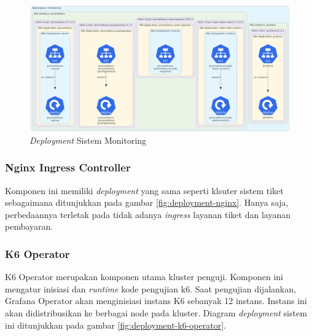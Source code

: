 \begin{figure}[htbp]
    \centering
    \includegraphics[width=1\textwidth]{resources/chapter-4/agent-monitoring.png}
    \caption{\textit{Deployment} Sistem Monitoring}
    \label{fig:deployment-monitoring-agent}
\end{figure}

\subsubsection{Nginx Ingress Controller}

Komponen ini memiliki \textit{deployment} yang sama seperti klsuter sistem tiket sebagaimana ditunjukkan pada gambar \ref{fig:deployment-nginx}. Hanya saja, perbedaannya terletak pada tidak adanya \textit{ingress} layanan tiket dan layanan pembayaran.

\pagebreak

\subsubsection{K6 Operator}

K6 Operator merupakan komponen utama kluster penguji. Komponen ini mengatur inisiasi dan \textit{runtime} kode pengujian k6. Saat pengujian dijalankan, Grafana Operator akan menginisiasi instans K6 sebanyak 12 instans. Instans ini akan didistribusikan ke berbagai node pada kluster. Diagram \textit{deployment} sistem ini ditunjukkan pada gambar \ref{fig:deployment-k6-operator}.

